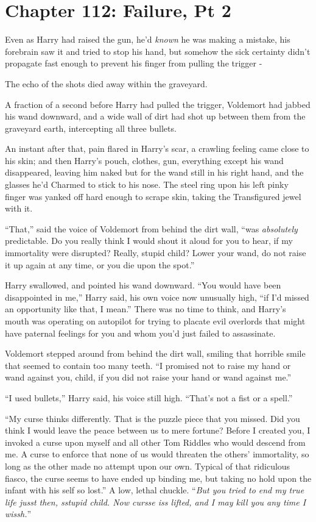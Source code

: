 \chapter{Chapter 112: Failure, Pt 2}
Even as Harry had raised the gun, he'd \emph{known} he was making a mistake, his forebrain saw it and tried to stop his hand, but somehow the sick certainty didn't propagate fast enough to prevent his finger from pulling the trigger -

The echo of the shots died away within the graveyard.

A fraction of a second before Harry had pulled the trigger, Voldemort had jabbed his wand downward, and a wide wall of dirt had shot up between them from the graveyard earth, intercepting all three bullets.

An instant after that, pain flared in Harry's scar, a crawling feeling came close to his skin; and then Harry's pouch, clothes, gun, everything except his wand disappeared, leaving him naked but for the wand still in his right hand, and the glasses he'd Charmed to stick to his nose. The steel ring upon his left pinky finger was yanked off hard enough to scrape skin, taking the Transfigured jewel with it.

``That,'' said the voice of Voldemort from behind the dirt wall, ``was \emph{absolutely} predictable. Do you really think I would shout it aloud for you to hear, if my immortality were disrupted? Really, stupid child? Lower your wand, do not raise it up again at any time, or you die upon the spot.''

Harry swallowed, and pointed his wand downward. ``You would have been disappointed in me,'' Harry said, his own voice now unusually high, ``if I'd missed an opportunity like that, I mean.'' There was no time to think, and Harry's mouth was operating on autopilot for trying to placate evil overlords that might have paternal feelings for you and whom you'd just failed to assassinate.

Voldemort stepped around from behind the dirt wall, smiling that horrible smile that seemed to contain too many teeth. ``I promised not to raise my hand or wand against you, child, if you did not raise your hand or wand against me.''

``I used bullets,'' Harry said, his voice still high. ``That's not a fist or a spell.''

``My curse thinks differently. That is the puzzle piece that you missed. Did you think I would leave the peace between us to mere fortune? Before I created you, I invoked a curse upon myself and all other Tom Riddles who would descend from me. A curse to enforce that none of us would threaten the others' immortality, so long as the other made no attempt upon our own. Typical of that ridiculous fiasco, the curse seems to have ended up binding me, but taking no hold upon the infant with his self so lost.'' A low, lethal chuckle. ``\emph{But you tried to end my true life jusst then, sstupid child. Now cursse iss lifted, and I may kill you any time I wissh.}''

